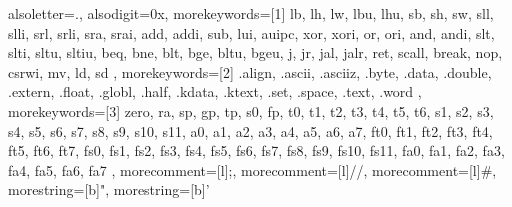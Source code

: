 \usepackage{colortbl}
\usepackage{listings}
\usepackage{tikz}
\usepackage{soul}
\usepackage{nicematrix}
\usepackage[normalem]{ulem}
\usepackage{tcolorbox}
\usepackage{diagbox}
\usepackage{multirow}
\usepackage{graphicx}
\usepackage{array}
\usepackage{paralist}
\usepackage{enumitem}
\usepackage{wrapfig}
\usepackage{calc}
\usepackage{makecell}


\usetikzlibrary{arrows}
\usetikzlibrary{backgrounds}
\usetikzlibrary{fit}
\usetikzlibrary{calc}
\usetikzlibrary{positioning}
\usetikzlibrary{shapes}


{
  alsoletter={.}, %
  alsodigit={0x}, %
  morekeywords=[1]{ %
    lb, lh, lw, lbu, lhu,
    sb, sh, sw,
    sll, slli, srl, srli, sra, srai,
    add, addi, sub, lui, auipc,
    xor, xori, or, ori, and, andi,
    slt, slti, sltu, sltiu,
    beq, bne, blt, bge, bltu, bgeu,
    j, jr, jal, jalr, ret,
    scall, break, nop, csrwi, mv, ld, sd
  },
  morekeywords=[2]{ %
    .align, .ascii, .asciiz, .byte, .data, .double, .extern,
    .float, .globl, .half, .kdata, .ktext, .set, .space, .text, .word
  },
  morekeywords=[3]{ %
    zero, ra, sp, gp, tp, s0, fp,
    t0, t1, t2, t3, t4, t5, t6,
    s1, s2, s3, s4, s5, s6, s7, s8, s9, s10, s11,
    a0, a1, a2, a3, a4, a5, a6, a7,
    ft0, ft1, ft2, ft3, ft4, ft5, ft6, ft7,
    fs0, fs1, fs2, fs3, fs4, fs5, fs6, fs7, fs8, fs9, fs10, fs11,
    fa0, fa1, fa2, fa3, fa4, fa5, fa6, fa7
  },
  morecomment=[l]{;},   %
  morecomment=[l]{//},   %
  morecomment=[l]{\#},  %
  morestring=[b]",      %
  morestring=[b]'       %
}

\makeatletter
\newcommand{\code}[1]{\protect\lstinline[language={[RISC-V]Assembler},basicstyle=\ttfamily]|#1|}
\makeatother


